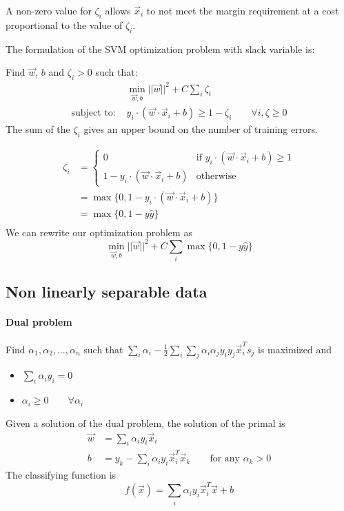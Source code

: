 \documentclass[a4paper,6pt,twocolumn,fleqn]{article}
\begin{document}
A non-zero value for \(\zeta_i\) allows \(\vec x_i\) to not meet the margin requirement at a cost proportional to the value of \(\zeta_i\).

The formulation of the SVM optimization problem with slack variable is:

Find \(\vec w\), \(b\) and \(\zeta_i>0\) such that:
\begin{align}
    &\min_{\vec w, b} ||\vec w||^2 + C \sum_i \zeta_i\\
    \text{subject to: } &y_i \cdot (\vec w \cdot \vec x_i + b) \geq 1 - \zeta_i \qquad \forall i, \zeta \geq 0
\end{align}
The sum of the \(\zeta_i\) gives an upper bound on the number of training errors.

\begin{align}
    \zeta_i & = \begin{cases}
        0 & \text{if } y_i \cdot (\vec w \cdot \vec x_i + b) \geq 1\\
        1 - y_i \cdot (\vec w \cdot \vec x_i + b) & \text{otherwise}
    \end{cases}\\
    & = \max\{0, 1 - y_i \cdot (\vec w \cdot \vec x_i + b)\}\\
    & = \max\{0, 1 - y \hat y\}\\
\end{align}
We can rewrite our optimization problem as
\begin{equation}
    \min_{\vec w,b} ||\vec w||^2 + C \sum_i \max\{0, 1 - y \hat y\}
\end{equation}
\subsection{Non linearly separable data} %
\paragraph{Dual problem} Find \(\alpha_1, \alpha_2, \ldots, \alpha_n\) such that \(\sum_i \alpha_i - \frac 1 2 \sum_i \sum_j \alpha_i \alpha_j y_i y_j \vec x_i^T s_j\) is maximized and 
\begin{itemize}
    \item \(\sum_i \alpha_i y_i = 0\)
    \item \(\alpha_i \geq 0 \qquad \forall \alpha_i\)
\end{itemize}
Given a solution of the dual problem, the solution of the primal is
\begin{align}
    \vec w &= \sum_i \alpha_i y_i \vec x_i\\
    b &= y_k - \sum_i \alpha_i y_i \vec x_i^T \vec x_k \qquad \text{for any } \alpha_k > 0
\end{align}
The classifying function is 
\begin{equation}
    f(\vec x) = \sum_i \alpha_i y_i \vec x_i^T \vec x + b
\end{equation}
\end{document}
